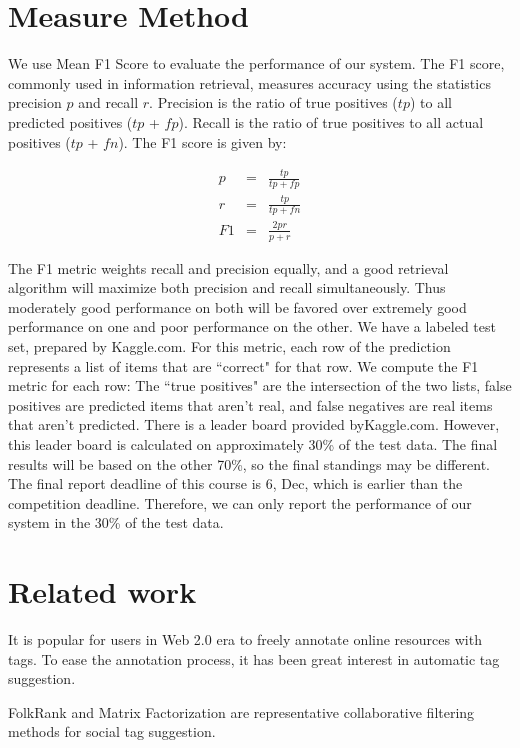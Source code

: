 \documentclass[11pt]{article} %
\begin{document}
\section{Measure Method}
We use Mean F1 Score to evaluate the performance of our system. The F1 score, commonly used in information retrieval, measures accuracy using the statistics precision $p$ and recall $r$. Precision is the ratio of true positives ($tp$) to all predicted positives ($tp$ + $fp$). Recall is the ratio of true positives to all actual positives ($tp$ + $fn$). The F1 score is given by:

\begin{eqnarray}
 p & = & \frac{tp}{tp+fp}\\
 r & = & \frac{tp}{tp+fn}\\
 F1 & = & \frac{2pr}{p+r}
\end{eqnarray}

The F1 metric weights recall and precision equally, and a good retrieval algorithm will maximize both precision and recall simultaneously. Thus moderately good performance on both will be favored over extremely good performance on one and poor performance on the other.
We have a labeled test set, prepared by Kaggle.com. For this metric, each row of the prediction represents a list of items that are ``correct" for that row. We compute the F1 metric for each row: The ``true positives" are the intersection of the two lists, false positives are predicted items that aren't real, and false negatives are real items that aren't predicted.
There is a leader board provided byKaggle.com. However, this leader board is calculated on approximately 30\% of the test data. The final results will be based on the other 70\%, so the final standings may be different. The final report deadline of this course is 6, Dec, which is earlier than the competition deadline. Therefore, we can only report the performance of our system in the 30\% of the test data.

\section{Related work}

It is popular for users in Web 2.0 era to freely annotate online resources with tags. To ease the annotation process, it has been great interest in automatic tag suggestion.

FolkRank \cite{jaschke2008tag} and Matrix Factorization \cite{rendle2009learning} are representative collaborative filtering methods for social tag suggestion.
\end{document}
